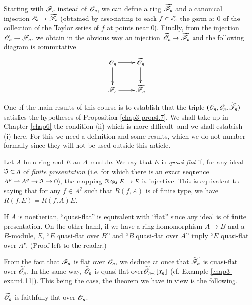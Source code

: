 Starting with $\mathscr{F}_{n}$ instead of $\mathscr{O}_{n}$, we can define a ring $\widetilde{\mathscr{F}}_{n}$ and a canonical injection $\mathscr{E}_{n}\to \widetilde{\mathscr{F}}_{n}$ (obtained by associating to each $f\in \mathscr{E}_{n}$ the germ at $0$ of the collection of the Taylor series of $f$ at points near $0$). Finally, from the injection $\mathscr{O}_{n}\to \mathscr{F}_{n}$, we obtain in the obvious way an injection $\widetilde{\mathscr{O}}_{n}\to \widetilde{\mathscr{F}}_{n}$ and the following diagram is commutative
\[
\xymatrix@=.8cm{
\scrO_{n}\ar[d]\ar[r] & \widetilde{\scrO}_{n}\ar[d]\\
\scrF_{n}\ar[r] & \widetilde{\scrF}_{n}
}
\]

One of the main results of this course is to establish that the triple $(\mathscr{O}_{n},\mathscr{E}_{n},\widetilde{\mathscr{F}}_{n})$ satisfies the hypotheses of Proposition \ref{chap3-prop4.7}. We shall take up in Chapter \ref{chap6} the condition (ii) which is more difficult, and we shall establish (i) here. For this we need a definition and some results, which we do not number formally since they will not be used outside this article.

\vfill\eject

Let $A$ be a ring and $E$ an $A$-module. We say that $E$ is {\em quasi-flat} if, for any ideal $\mathfrak{I}\subset A$ of {\em finite presentation} (i.e. for which there is an exact sequence $A^{p}\to A^{q}\to \mathfrak{I}\to 0$), the mapping $\mathfrak{I}\otimes_{A}E\to E$ is injective. This is equivalent to saying that for any $f\in A^{q}$ such that $R(f,A)$ is of finite type, we have $R(f,E)=R(f,A)E$.

If $A$ is noetherian, ``quasi-flat'' is equivalent with ``flat'' since any ideal is of finite presentation. On the other hand, if we have a ring homomorphism $A\to B$ and a $B$-module, $E$, ``$E$ quasi-flat over $B$'' and ``$B$ quasi-flat over $A$'' imply ``$E$ quasi-flat over $A$''. (Proof left to the reader.)

\begin{examples*}
From the fact that $\mathscr{F}_{n}$ is flat over $\mathscr{O}_{n}$, we deduce at once that $\widetilde{\mathscr{F}}_{n}$ is quasi-flat over $\widetilde{\mathscr{O}}_{n}$. In the same way, $\widetilde{\mathscr{O}}_{n}$ is quasi-flat over\pageoriginale $\widetilde{\mathscr{O}}_{n-1}[x_{n}]$ (cf. Example \ref{chap3-exam4.11}). This being the case, the theorem we have in view is the following.
\end{examples*}

\begin{theorem}[Oka]\label{chap3-thm4.12}
$\widetilde{\mathscr{O}}_{n}$ is faithfully flat over $\mathscr{O}_{n}$.
\end{theorem}


